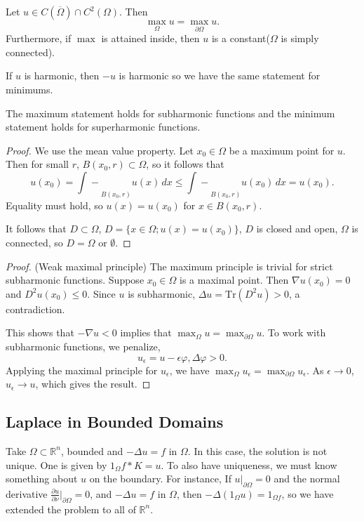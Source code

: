 \documentclass[12pt]{scrartcl}
\newcommand{\R}{\mathbb{R}}
\let \phi \varphi
\newcommand{\aint}{\mathrel{\int\!\!\!\!\!\!-}}
\let \grad \nabla
\begin{document}
\begin{thm}
Let $u \in C(\overline{\Omega}) \cap C^2(\Omega)$.  Then $$\max_{\Omega } u = \max_{\partial \Omega} u.$$
Furthermore, if $\max$ is attained inside, then $u$ is a constant($\Omega$ is simply connected).
\end{thm}
\begin{remark} If $u$ is harmonic, then $-u$ is harmonic so we have the same statement for minimums.
\end{remark}
\begin{remark} The maximum statement holds for subharmonic functions and the minimum statement holds for superharmonic functions.
\end{remark}
\begin{proof} We use the mean value property.  Let $x_0 \in \Omega$ be a maximum point for $u$.  Then for small $r$, $B(x_0, r) \subset \Omega$, so it follows that 
$$u(x_0) = \aint_{B(x_0, r)} u(x)\,dx \le \aint_{B(x_0, r)} u(x_0)\,dx = u(x_0).$$
Equality must hold, so $u(x) = u(x_0)$ for $x \in B(x_0, r)$.

It follows that $D \subset \Omega$, $D  = \{x \in \Omega; u(x) = u(x_0)\}$, $D$ is closed and open, $\Omega $ is connected, so $D = \Omega$ or $\emptyset$. 
\end{proof}
\begin{proof}(Weak maximal principle) The maximum principle is trivial for strict subharmonic functions.  Suppose $x_0 \in \Omega$ is a maximal point.  Then $\grad u(x_0) = 0$ and $D^2u(x_0) \le 0$.  Since $u$ is subharmonic, $\Delta u = \text{Tr}(D^2 u) > 0$, a contradiction.

This shows that $-\grad u < 0$ implies that $\max_{\Omega} u = \max_{\partial \Omega} u$.  To work with subharmonic functions, we penalize,
$$u_\epsilon = u - \epsilon \phi, \Delta \phi >0.$$
Applying the maximal principle for $u_\epsilon$, we have $\max_\Omega u_\epsilon = \max_{\partial \Omega} u_\epsilon$.  As $\epsilon \to 0$, $u_\epsilon \to u$, which gives the result.
\end{proof}

\subsection{Laplace in Bounded Domains}
Take $\Omega \subset \R^n$, bounded and $-\Delta u = f$ in $\Omega$.  In this case, the solution is not unique.  One is given by $1_\Omega f * K = u$.  To also have uniqueness, we must know something about $u$ on the boundary.  For instance, If $u\vert_{\partial \Omega} = 0$ and the normal derivative $\frac{\partial u}{\partial \nu}\vert_{\partial \Omega} = 0$, and $-\Delta u = f$ in $\Omega$, then $-\Delta(1_{\Omega} u) = 1_{\Omega f}$, so we have extended the problem to all of $\R^n$.
\end{document}
